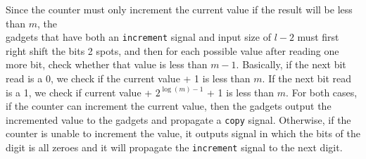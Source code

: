 Since the counter must only increment the current value if the result will be less than $m$,
the \\{\cread} gadgets that have both an {\tt increment} signal and input size of $l - 2$ must
first right shift the bits 2 spots, and then for each possible value after reading one more bit,
check whether that value is less than $m - 1$. %
%
Basically, if the next bit read is a 0, we check if the current value + 1 is less than $m$.
%
%
%
%
%
%
%
If the next bit read is a 1, we check if current value + $2^{\log (m) - 1}$ + 1 is less than $m$.
%
For both cases, if the counter can increment the current value, then
the {\cread} gadgets output the incremented value to the {\prewarp} gadgets and propagate a {\tt copy}
signal. Otherwise, if the counter is unable to increment the value, it outputs signal in which the bits
of the digit is all zeroes and it will propagate the {\tt increment} signal to the next digit.

